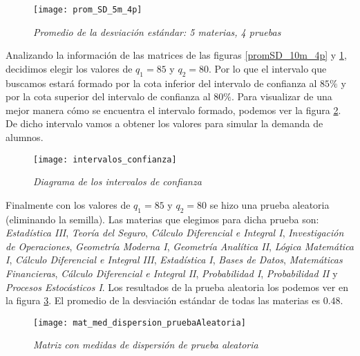 \begin{figure}[H]
\centering
\texttt{[image: prom\_SD\_5m\_4p]} %
\caption{\textit{Promedio de la desviación estándar: 5 materias, 4 pruebas}}\label{promSD_5m_4p}
\end{figure}

Analizando la información de las matrices de las figuras \ref{promSD_10m_4p} y \ref{promSD_5m_4p}, decidimos elegir los valores de $q_{1} = 85$ y $q_{2} = 80$. Por lo que el intervalo que buscamos estará formado por la cota inferior del intervalo de confianza al $85\%$ y por la cota superior del intervalo de confianza al $80\%$. Para visualizar de una mejor manera cómo se encuentra el intervalo formado, podemos ver la figura \ref{interConf}. De dicho intervalo vamos a obtener los valores para simular la demanda de alumnos.

\begin{figure}[H]
\centering
\texttt{[image: intervalos\_confianza]} %
\caption{\textit{Diagrama de los intervalos de confianza}}\label{interConf}
\end{figure}

Finalmente con los valores de $q_{1} = 85$ y $q_{2} = 80$ se hizo una prueba aleatoria (eliminando la semilla). Las materias que elegimos para dicha prueba son: \textit{Estadística III}, \textit{Teoría del Seguro}, \textit{Cálculo Diferencial e Integral I}, \textit{Investigación de Operaciones}, \textit{Geometría Moderna I}, \textit{Geometría Analítica II}, \textit{Lógica Matemática I}, \textit{Cálculo Diferencial e Integral III}, \textit{Estadística I}, \textit{Bases de Datos}, \textit{Matemáticas Financieras}, \textit{Cálculo Diferencial e Integral II}, \textit{Probabilidad I}, \textit{Probabilidad II} y \textit{Procesos Estocásticos I}. Los resultados de la prueba aleatoria los podemos ver en la figura \ref{mat_med_dispersion_pruebaAl}. El promedio de la desviación estándar de todas las materias es $0.48$.%

\begin{figure}[H]
\centering
\texttt{[image: mat\_med\_dispersion\_pruebaAleatoria]} %
\caption{\textit{Matriz con medidas de dispersión de prueba aleatoria}}\label{mat_med_dispersion_pruebaAl}
\end{figure}